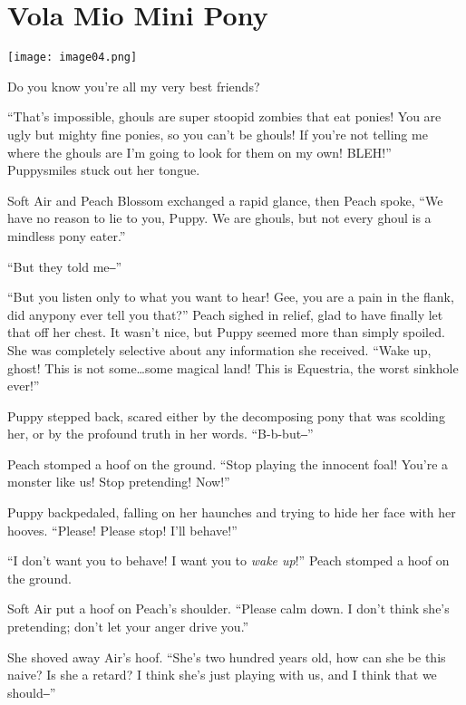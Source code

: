
\chapter{Vola Mio Mini Pony}

\texttt{[image: image04.png]}

\begin{intro}
Do you know you're all my very best friends?
\end{intro}



``That's impossible, ghouls are super stoopid zombies that eat ponies! You are ugly but mighty fine ponies, so you can't be ghouls! If you're not telling me where the ghouls are I'm going to look for them on my own! BLEH!'' Puppysmiles stuck out her tongue.

Soft Air and Peach Blossom exchanged a rapid glance, then Peach spoke, ``We have no reason to lie to you, Puppy. We are ghouls, but not every ghoul is a mindless pony eater.''

``But they told me‒''

``But you listen only to what you want to hear! Gee, you are a pain in the flank, did anypony ever tell you that?'' Peach sighed in relief, glad to have finally let that off her chest. It wasn't nice, but Puppy seemed more than simply spoiled. She was completely selective about any information she received. ``Wake up, ghost! This is not some\dots some magical land! This is Equestria, the worst sinkhole ever!''

Puppy stepped back, scared either by the decomposing pony that was scolding her, or by the profound truth in her words. ``B-b-but‒''

Peach stomped a hoof on the ground. ``Stop playing the innocent foal! You're a monster like us! Stop pretending! Now!''

Puppy backpedaled, falling on her haunches and trying to hide her face with her hooves. ``Please! Please stop! I'll behave!''

``I don't want you to behave! I want you to \emph{wake up}!'' Peach stomped a hoof on the ground.

Soft Air put a hoof on Peach's shoulder. ``Please calm down. I don't think she's pretending; don't let your anger drive you.''

She shoved away Air's hoof. ``She's two hundred years old, how can she be this naive? Is she a retard? I think she's just playing with us, and I think that we should‒''

